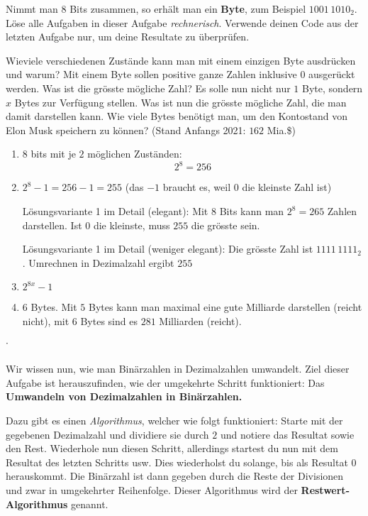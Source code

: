 \begin{question}
	Nimmt man $8$ Bits zusammen, so erhält man ein \textbf{Byte}, zum Beispiel $1001\,1010_2$.
	Löse alle Aufgaben in dieser Aufgabe \textit{rechnerisch}. Verwende deinen Code aus der letzten Aufgabe nur, um deine Resultate zu überprüfen.
	\begin{tasks}
		\task Wieviele verschiedenen Zustände kann man mit einem einzigen Byte ausdrücken und warum?
		\task Mit einem Byte sollen positive ganze Zahlen inklusive $0$ ausgerückt werden. Was ist die grösste mögliche Zahl?
		\task Es solle nun nicht nur $1$ Byte, sondern $x$ Bytes zur Verfügung stellen. Was ist nun die grösste mögliche Zahl, die man damit darstellen kann.
		\task Wie viele Bytes benötigt man, um den Kontostand von Elon Musk speichern zu können? (Stand Anfangs 2021: $162$ Mia.\$)
	\end{tasks}
\end{question}
\cprotEnv\begin{solution}
	\begin{enumerate}[label=\alph*)]
		\item $8$ bits mit je $2$ möglichen Zuständen:
		$$2^8 = 256$$
		\item $2^8-1 = 256 - 1 = 255$ (das $-1$ braucht es, weil $0$ die kleinste Zahl ist)

		Lösungsvariante 1 im Detail (elegant): Mit $8$ Bits kann man $2^8 = 265$ Zahlen darstellen. Ist $0$ die kleinste, muss $255$ die grösste sein.

		Lösungsvariante 1 im Detail (weniger elegant):
		Die grösste Zahl ist $1111\,1111_2$. Umrechnen in Dezimalzahl ergibt $255$
		\item $2^{8x}-1$
		\item $6$ Bytes. Mit $5$ Bytes kann man maximal eine gute Milliarde darstellen (reicht nicht), mit $6$ Bytes sind es $281$ Milliarden (reicht).
	\end{enumerate}
\end{solution}

˙\newpage

Wir wissen nun, wie man Binärzahlen in Dezimalzahlen umwandelt.
Ziel dieser Aufgabe ist herauszufinden, wie der umgekehrte Schritt funktioniert: Das \textbf{Umwandeln von Dezimalzahlen in Binärzahlen.}

Dazu gibt es einen \textit{Algorithmus}, welcher wie folgt funktioniert: Starte mit der gegebenen Dezimalzahl und dividiere sie durch $2$ und notiere das Resultat sowie den Rest. Wiederhole nun diesen Schritt, allerdings startest du nun mit dem Resultat des letzten Schritts usw. Dies wiederholst du solange, bis als Resultat $0$ herauskommt. Die Binärzahl ist dann gegeben durch die Reste der Divisionen und zwar in umgekehrter Reihenfolge. Dieser Algorithmus wird der \textbf{Restwert-Algorithmus} genannt.

